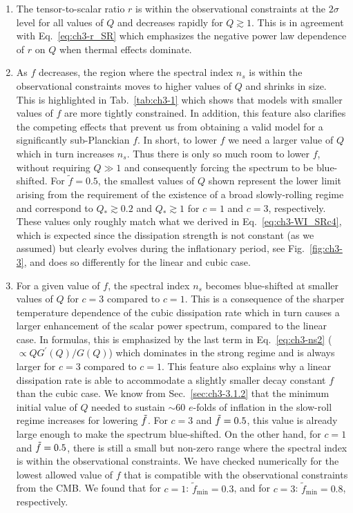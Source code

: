 \begin{enumerate}

    \item The tensor-to-scalar ratio $r$ is within the observational constraints at the $2\sigma$ level for all values of $Q$ and decreases rapidly for $Q\gtrsim 1$. This is in agreement with Eq.~\ref{eq:ch3-r_SR} which emphasizes the negative power law dependence of $r$ on $Q$ when thermal effects dominate.

    \item As $f$ decreases, the region where the spectral index $n_s$ is within the observational constraints moves to higher values of $Q$ and shrinks in size. This is highlighted in Tab.~\ref{tab:ch3-1} which shows that models with smaller values of $f$ are more tightly constrained. In addition, this feature also clarifies the competing effects that prevent us from obtaining a valid model for a significantly sub-Planckian $f$. In short, to lower $f$ we need a larger value of $Q$ which in turn increases $n_s$. Thus there is only so much room to lower $f$, without requiring $Q \gg 1$ and consequently forcing the spectrum to be blue-shifted. For $\tilde{f}=0.5$, the smallest values of $Q$ shown represent the lower limit arising from the requirement of the existence of a broad slowly-rolling regime and correspond to $Q_{*}\gtrsim 0.2$ and $Q_{*}\gtrsim 1$ for $c=1$ and $c=3$, respectively. These values only roughly match what we derived in Eq.~\ref{eq:ch3-WI_SRc4}, which is expected since the dissipation strength is not constant (as we assumed) but clearly evolves during the inflationary period, see Fig.~\ref{fig:ch3-3}, and does so differently for the linear and cubic case.

    \item For a given value of $f$, the spectral index $n_s$ becomes blue-shifted at smaller values of $Q$ for $c=3$ compared to $c=1$. This is a consequence of the sharper temperature dependence of the cubic dissipation rate which in turn causes a larger enhancement of the scalar power spectrum, compared to the linear case. In formulas, this is emphasized by the last term in Eq.~\ref{eq:ch3-ns2} ($\propto Q G^\prime (Q)/G(Q)$) which dominates in the strong regime and is always larger for $c=3$ compared to $c=1$. This feature also explains why a linear dissipation rate is able to accommodate a slightly smaller decay constant $f$ than the cubic case. We know from Sec.~\ref{sec:ch3-3.1.2} that the minimum initial value of $Q$ needed to sustain $\sim 60$ $e$-folds of inflation in the slow-roll regime increases for lowering $\Tilde{f}$. For $c=3$ and $\Tilde{f}=0.5$, this value is already large enough to make the spectrum blue-shifted. On the other hand, for $c=1$ and $\Tilde{f}=0.5$, there is still a small but non-zero range where the spectral index is within the observational constraints. We have checked numerically for the lowest allowed value of $f$ that is compatible with the observational constraints from the CMB. We found that for $c=1$: $\tilde{f}_{\mathrm{min}}=0.3$, and for $c=3$: $\tilde{f}_{\mathrm{min}}=0.8$, respectively.


\end{enumerate}
